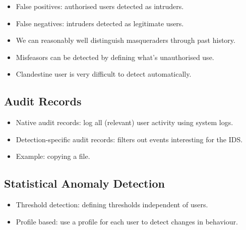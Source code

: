 \documentclass{beamer}
\begin{document}
\begin{frame}{\insertsubsectionhead}
  \begin{itemize}
    \item False positives: authorised users detected as intruders.
    \item False negatives: intruders detected as legitimate users.

    \item We can reasonably well distinguish masqueraders through past history.

    \item Misfeasors can be detected by defining what's unauthorised use.

    \item Clandestine user is very difficult to detect automatically.

  \end{itemize}
\end{frame}

\subsection{Audit Records}

\begin{frame}{\insertsubsectionhead}
  \begin{itemize}
    \item Native audit records: log all (relevant) user activity using system 
      logs.

    \item Detection-specific audit records: filters out events interesting for 
      the IDS.
      
    \item Example: copying a file.

  \end{itemize}
\end{frame}

\subsection{Statistical Anomaly Detection}

\begin{frame}{\insertsubsectionhead}
  \begin{itemize}
    \item Threshold detection: defining thresholds independent of users.

    \item Profile based: use a profile for each user to detect changes in 
      behaviour.

  \end{itemize}
\end{frame}
\end{document}
